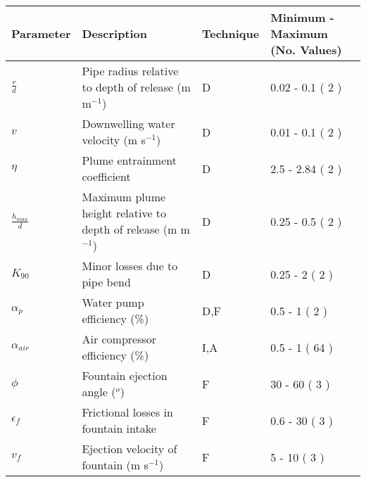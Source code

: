 \documentclass[12pt]{standalone}
\begin{document}
\begin{table}[ht]
\centering
\begin{tabular}{llll}
  \hline
Parameter & Description & Technique & Minimum - Maximum (No. Values) \\ 
  \hline
$\frac{r}{d}$ & Pipe radius relative to depth of release (m m$^{-1}$) & D & 0.02 - 0.1  ( 2 ) \\ 
  $v$ & Downwelling water velocity (m s$^{-1}$) & D & 0.01 - 0.1  ( 2 ) \\ 
  $\eta$ & Plume entrainment coefficient & D & 2.5 - 2.84  ( 2 ) \\ 
  $\frac{h_{max}}{d}$ & Maximum plume height relative to depth of release (m m$^{-1}$) & D & 0.25 - 0.5  ( 2 ) \\ 
  $K_{90}$ & Minor losses due to pipe bend & D & 0.25 - 2  ( 2 ) \\ 
  $\alpha_p$ & Water pump efficiency (\%) & D,F & 0.5 - 1  ( 2 ) \\ 
  $\alpha_{air}$ & Air compressor efficiency (\%) & I,A & 0.5 - 1  ( 64 ) \\ 
  $\phi$ & Fountain ejection angle ($^o$) & F & 30 - 60  ( 3 ) \\ 
  $\epsilon_f$ & Frictional losses in fountain intake & F & 0.6 - 30  ( 3 ) \\ 
  $v_f$ & Ejection velocity of fountain (m s$^{-1}$) & F & 5 - 10  ( 3 ) \\ 
   \hline
\end{tabular}
\end{table}
\end{document}
